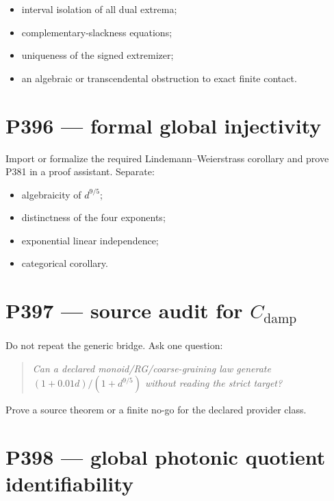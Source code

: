 \documentclass[11pt,a4paper,openany]{report}
\begin{document}
\begin{itemize}
\item 
interval isolation of all dual extrema;

\item 
complementary-slackness equations;

\item 
uniqueness of the signed extremizer;

\item 
an algebraic or transcendental obstruction to exact finite contact.

\end{itemize}

\section{P396 --- formal global injectivity}

Import or formalize the required Lindemann--Weierstrass corollary and prove P381 in a proof assistant. Separate:

\begin{itemize}
\item 
algebraicity of \(d^{9/5}\);

\item 
distinctness of the four exponents;

\item 
exponential linear independence;

\item 
categorical corollary.

\end{itemize}

\section{\texorpdfstring{P397 --- source audit for \(C_{\mathrm{damp}}\)}{P397 --- source audit for C\_damp}}

Do not repeat the generic bridge. Ask one question:

\begin{quote}\itshape
Can a declared monoid/\allowbreak{}RG/\allowbreak{}coarse-graining law generate \((1+0.01d)/(1+d^{9/5})\) without reading the strict target?

\end{quote}

Prove a source theorem or a finite no-go for the declared provider class.

\section{P398 --- global photonic quotient identifiability}
\end{document}
